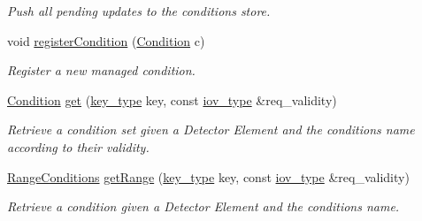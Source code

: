 \begin{DoxyCompactItemize}
\begin{DoxyCompactList}\small\item\em Push all pending updates to the conditions store. \item\end{DoxyCompactList}\item 
void \hyperlink{class_d_d4hep_1_1_conditions_1_1_conditions_manager_object_af839b57cfdda205e2555e757651423fd}{registerCondition} (\hyperlink{class_d_d4hep_1_1_conditions_1_1_condition}{Condition} c)
\begin{DoxyCompactList}\small\item\em Register a new managed condition. \item\end{DoxyCompactList}\item 
\hyperlink{class_d_d4hep_1_1_conditions_1_1_condition}{Condition} \hyperlink{class_d_d4hep_1_1_conditions_1_1_conditions_manager_object_aa2b1c984fdda098cfbaba3e9ed09accd}{get} (\hyperlink{class_d_d4hep_1_1_conditions_1_1_conditions_manager_object_ac44eafc69174743e81d2f60e1f510719}{key\_\-type} key, const \hyperlink{class_d_d4hep_1_1_i_o_v}{iov\_\-type} \&req\_\-validity)
\begin{DoxyCompactList}\small\item\em Retrieve a condition set given a Detector Element and the conditions name according to their validity. \item\end{DoxyCompactList}\item 
\hyperlink{namespace_d_d4hep_1_1_conditions_ae765f0140a33973a430280f02b6062f4}{RangeConditions} \hyperlink{class_d_d4hep_1_1_conditions_1_1_conditions_manager_object_ac1c07dfc605bd517d4edfcca2c4bd21a}{getRange} (\hyperlink{class_d_d4hep_1_1_conditions_1_1_conditions_manager_object_ac44eafc69174743e81d2f60e1f510719}{key\_\-type} key, const \hyperlink{class_d_d4hep_1_1_i_o_v}{iov\_\-type} \&req\_\-validity)
\begin{DoxyCompactList}\small\item\em Retrieve a condition given a Detector Element and the conditions name. \item\end{DoxyCompactList}\end{DoxyCompactItemize}
